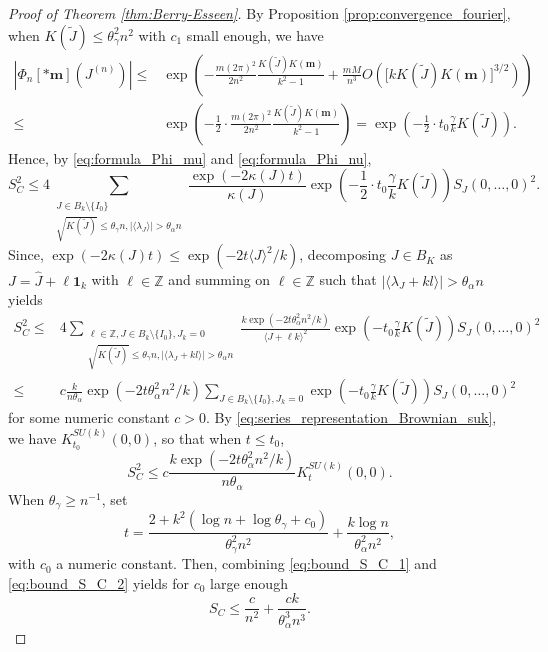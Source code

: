 \documentclass[10pt,11pt]{amsart}%
\begin{document}
\begin{proof}[Proof of Theorem \ref{thm:Berry-Esseen}]
By Proposition \ref{prop:convergence_fourier}, when $K(\tilde{J})\leq \theta_{\gamma}^2 n^2$ with $c_1$ small enough, we have 
\begin{align*}
\left\vert\Phi_{n}[*\mathbf{m}](J^{(n)})\right\vert \leq& \exp\left(-\frac{m(2\pi)^2}{2n^2}\frac{K(\tilde{J})K(\mathbf{m})}{k^2-1}+\frac{mM}{n^3}O\left(\Big[kK(\tilde{J})K(\mathbf{m})\Big]^{3/2}\right)\right)\\
\leq& \exp\left(-\frac{1}{2}\cdot\frac{m(2\pi)^2}{2n^2}\frac{K(\tilde{J})K(\mathbf{m})}{k^2-1}\right)=\exp\left(-\frac{1}{2}\cdot t_0\frac{\gamma}{k} K(\tilde{J})\right).
\end{align*}
Hence, by \eqref{eq:formula_Phi_mu} and \eqref{eq:formula_Phi_nu},
$$S_C^2\leq 4\sum_{\substack{J\in B_{k}\setminus\{I_0\}\\\sqrt{K(\tilde{J})}\leq \theta_{\gamma} n,\vert\langle \lambda_J\rangle\vert> \theta_{\alpha}n}}\frac{\exp(-2\kappa(J)t)}{\kappa(J)}\exp\left(-\frac{1}{2}\cdot t_0\frac{\gamma}{k} K(\tilde{J})\right)S_J(0,\ldots,0)^2.$$
Since, $\exp(-2\kappa(J)t)\leq \exp(-2t\langle J\rangle^2/k)$, decomposing $J\in B_{K}$ as $J=\hat{J}+\ell \mathbf{1}_k$ with $\ell\in\mathbb{Z}$ and summing on $\ell\in \mathbb{Z}$ such that $\vert\langle \lambda_J+kl\rangle\vert> \theta_{\alpha}n$ yields
\begin{align*}
S_C^2\leq & 4\sum_{\substack{\ell\in \mathbb{Z},J\in B_{k}\setminus\{I_0\}, J_{k}=0\\\sqrt{K(\tilde{J})}\leq \theta_{\gamma} n,\vert\langle \lambda_J+kl\rangle\vert> \theta_{\alpha}n}}\frac{k\exp(-2t\theta_{\alpha}^2n^2/k)}{\langle J+\ell k\rangle^2}\exp\left(-t_0\frac{\gamma}{k} K(\tilde{J})\right)S_J(0,\ldots,0)^2\\
\leq &c\frac{k}{n\theta_{\alpha}}\exp(-2t\theta_{\alpha}^2n^2/k)\sum_{J\in B_{k}\setminus\{I_0\}, J_{k}=0}\exp\left(- t_0\frac{\gamma}{k} K(\tilde{J})\right)S_J(0,\ldots,0)^2
\end{align*}
for some numeric constant $c>0$. By \eqref{eq:series_representation_Brownian_suk}, we have $K_{t_0}^{SU(k)}(0,0)$, so that when $t\leq t_0$,
\begin{equation}\label{eq:bound_S_C_2}
S_C^2\leq c\frac{k\exp(-2t\theta_{\alpha}^2n^2/k)}{n\theta_{\alpha}}K_{t}^{SU(k)}(0,0).
\end{equation}
When $\theta_{\gamma}\geq n^{-1}$, set
\begin{equation}\label{eq:choice_t}
t=\frac{2+k^2(\log n+\log \theta_{\gamma}+c_0)}{\theta_{\gamma}^2n^2}+\frac{k\log n}{\theta_{\alpha}^2n^2},
\end{equation}
with $c_0$ a numeric constant. Then, combining \eqref{eq:bound_S_C_1} and \eqref{eq:bound_S_C_2} yields for $c_0$ large enough
\begin{equation}\label{eq:bound_S_C}
S_C\leq \frac{c}{n^{2}}+\frac{ck}{\theta_{\alpha}^3n^3}.
\end{equation}


\end{proof}
\end{document}
